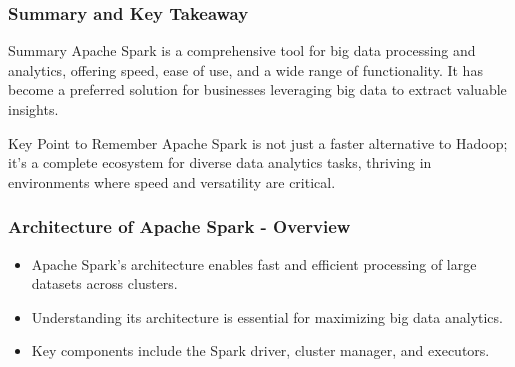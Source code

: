 \documentclass[aspectratio=169]{beamer}
\begin{document}
\begin{frame}[fragile]
    \frametitle{Summary and Key Takeaway}
    \begin{block}{Summary}
        Apache Spark is a comprehensive tool for big data processing and analytics, offering speed, ease of use, and a wide range of functionality. It has become a preferred solution for businesses leveraging big data to extract valuable insights.
    \end{block}
    \begin{block}{Key Point to Remember}
        Apache Spark is not just a faster alternative to Hadoop; it’s a complete ecosystem for diverse data analytics tasks, thriving in environments where speed and versatility are critical.
    \end{block}
\end{frame}

\begin{frame}[fragile]
    \frametitle{Architecture of Apache Spark - Overview}
    \begin{itemize}
        \item Apache Spark's architecture enables fast and efficient processing of large datasets across clusters.
        \item Understanding its architecture is essential for maximizing big data analytics.
        \item Key components include the Spark driver, cluster manager, and executors.
    \end{itemize}
\end{frame}
\end{document}
